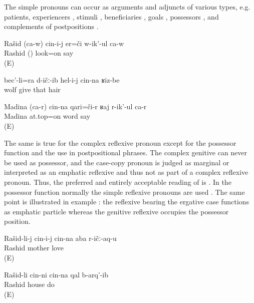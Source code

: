 The simple pronouns can occur as arguments and adjuncts of various types, e.g. patients, experiencers , stimuli , beneficiaries , goals , possessors , and complements of postpositions . 
%
\begin{exe}
	\ex	\label{ex:Rashid is looking at himselfA}
	\gll	Rašid	(ca-w)	cin-i-j	er=či	w-ik'-ul	ca-w\\
		Rashid	()		look=on	say	\\
	\glt	{} (E)

	\ex	\label{ex:‎‎‎The wolf gave him also his hair}
	\gll	bec'-li=ra	d-ičː-ib	hel-i-j	cin-na	ʁiz-be\\
		wolf	give	that		hair\\
	\glt	{}

	\ex	\label{ex:Madina is talking about herself}
	\gll	Madina	(ca-r)	cin-na	qari=či-r	ʁaj	r-ik'-ul	ca-r\\
		Madina			at.top=on	word	say	\\
	\glt	{} (E)
\end{exe}

The same is true for the complex reflexive pronoun except for the possessor function and the use in postpositional phrases. The complex genitive can never be used as possessor, and the case-copy pronoun is judged as marginal or interpreted as an emphatic reflexive and thus not as part of a complex reflexive pronoun. Thus, the preferred and entirely acceptable reading of  is . In the possessor function normally the simple reflexive pronouns are used . The same point is illustrated in example : the reflexive bearing the ergative case functions as emphatic particle whereas the genitive reflexive occupies the possessor position.
%
\begin{exe}
	\ex	\label{ex:Rashid loves his mother}
		Rašid-li-j	cin-i-j	cin-na	aba	r-ičː-aq-u\\
		{}	Rashid			mother	love\\
	\glt	{} (E)

	\ex	\label{ex:Rashid himself / alone built his house}
	\gll	Rašid-li	cin-ni	cin-na	qal	b-arq'-ib\\
		Rashid			house	do\\
	\glt	{} (E)
\end{exe}

